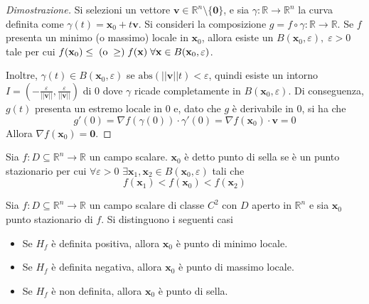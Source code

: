             \begin{proof}[Dimostrazione]
                Si selezioni un vettore $\mathbf{v} \in \mathbb{R}^{n} \setminus \{\mathbf{0}\}$, e sia $\gamma: \mathbb{R} \rightarrow \mathbb{R}^{n}$ la curva definita come $\gamma(t) = \mathbf{x}_0 + t \mathbf{v}$.
                Si consideri la composizione $g = f \circ \gamma: \mathbb{R} \rightarrow \mathbb{R}$.
                Se $f$ presenta un minimo (o massimo) locale in $\mathbf{x}_0$, allora esiste un $B(\mathbf{x}_0, \varepsilon), \; \varepsilon > 0$ tale per cui $f(\mathbf{x}_0) \leq \; (\textnormal{o} \;\geq) \; f(\mathbf{x}) \; \forall \mathbf{x} \in B(\mathbf{x}_0, \varepsilon)$.

                Inoltre, $\gamma(t) \in B(\mathbf{x}_0, \varepsilon)$ se $\text{abs}(||\mathbf{v}||t) < \varepsilon$, quindi esiste un intorno $I = \displaystyle (-\frac{\varepsilon}{||\mathbf{v}||}, \frac{\varepsilon}{||\mathbf{v}||})$ di $0$ dove $\gamma$ ricade completamente in
                $B(\mathbf{x}_0, \varepsilon)$. Di conseguenza, $g(t)$ presenta un estremo locale in $0$ e, dato che $g$ è derivabile in $0$, si ha che
                \[
                    g'(0) = \nabla f(\gamma(0)) \cdot \gamma'(0) = \nabla f(\mathbf{x}_0) \cdot \mathbf{v} = 0
                \]
                Allora $\nabla f(\mathbf{x}_0) = \mathbf{0}$.
            \end{proof}

            \begin{definition}
                Sia $f: D \subseteq \mathbb{R}^{n} \rightarrow \mathbb{R}$ un campo scalare. $\mathbf{x}_0$ è detto punto di sella se è un punto stazionario per cui $\forall \varepsilon > 0$ $\exists \mathbf{x}_1, \mathbf{x}_2 \in B(\mathbf{x}_0, \varepsilon)$ tali che
                \[
                    f(\mathbf{x}_1) < f(\mathbf{x}_0) < f(\mathbf{x}_2)
                \]
            \end{definition}

            \begin{theorem}
                Sia $f: D \subseteq \mathbb{R}^{n} \rightarrow \mathbb{R}$ un campo scalare di classe $C^2$ con $D$ aperto in $\mathbb{R}^{n}$ e sia $\mathbf{x}_0$ punto stazionario di $f$. Si distinguono i seguenti casi
                \begin{itemize}
                    \item Se $H_{f}$ è definita positiva, allora $\mathbf{x}_0$ è punto di minimo locale.
                    \item Se $H_{f}$ è definita negativa, allora $\mathbf{x}_0$ è punto di massimo locale.
                    \item Se $H_{f}$ è non definita, allora $\mathbf{x}_0$ è punto di sella.
                \end{itemize}
            \end{theorem}


